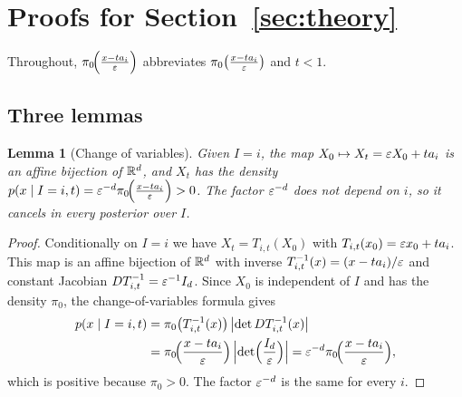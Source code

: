 \documentclass{article} %
\newcommand{\iclrbr}{\\&}\newcommand{\iclrbrq}{\\&\qquad}\newcommand{\iclrqbr}{\\&}
\newcommand{\iclrbr}{}\newcommand{\iclrbrq}{}\newcommand{\iclrqbr}{\qquad}
\theoremstyle{plain}
\newtheorem{lemma}[theorem]{Lemma}
\theoremstyle{definition}
\theoremstyle{remark}
\begin{document}
\section{Proofs for Section~\ref{sec:theory}}
\label{app:proofs}

Throughout, $\pi_0\!\Big(\frac{x-ta_{i}}{\varepsilon}\Big)$ abbreviates $\pi_0\big(\frac{x-ta_i}{\varepsilon}\big)$ and $t<1$.

\subsection{Three lemmas}
\label{apx:lemmas}

\begin{lemma}[Change of variables]
\label{lem:cov}
Given $I=i$, the map $X_0\mapsto X_t=\varepsilon X_0+ta_i$ is an affine bijection of $\mathbb{R}^d$, and
$X_t$ has the density $p(x\mid I=i,t)=\varepsilon^{-d}\pi_0\!\Big(\frac{x-ta_{i}}{\varepsilon}\Big)>0$. The factor $\varepsilon^{-d}$ does not
depend on $i$, so it cancels in every posterior over $I$.
\end{lemma}
\begin{proof}
Conditionally on $I=i$ we have $X_t=T_{i,t}(X_0)$ with $T_{i,t}(x_0)=\varepsilon x_0+ta_i$. This map is
an affine bijection of $\mathbb{R}^d$ with inverse $T_{i,t}^{-1}(x)=(x-ta_i)/\varepsilon$ and constant Jacobian
$DT_{i,t}^{-1}=\varepsilon^{-1}I_d$. Since $X_0$ is independent of $I$ and has the density $\pi_0$, the
change-of-variables formula gives
\begin{align*}
p(x\mid I=i,t)
&=\pi_0\bigl(T_{i,t}^{-1}(x)\bigr)\,\bigl|\det DT_{i,t}^{-1}(x)\bigr|
\iclrbr=\src{i}\,\Bigl|\det\Bigl(\frac{I_d}{\eps}\Bigr)\Bigr|
=\eps^{-d}\src{i},
\end{align*}
which is positive because $\pi_0>0$. The factor $\varepsilon^{-d}$ is the same for every $i$.
\end{proof}
\end{document}

